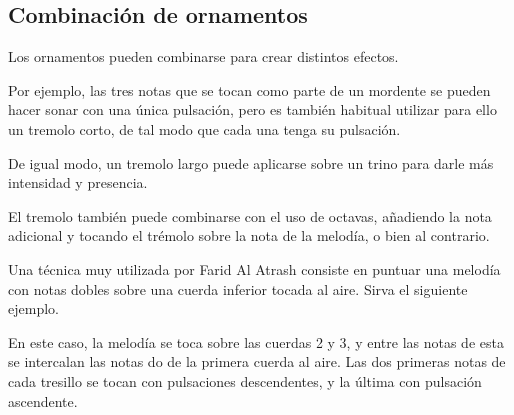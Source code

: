 \subsection{Combinación de ornamentos}

Los ornamentos pueden combinarse para crear distintos efectos.

Por ejemplo, las tres notas que se tocan como parte de un mordente se pueden hacer sonar con una única pulsación, pero es también habitual utilizar para ello un tremolo corto, de tal modo que cada una tenga su pulsación.

De igual modo, un tremolo largo puede aplicarse sobre un trino para darle más intensidad y presencia.

El tremolo también puede combinarse con el uso de octavas, añadiendo la nota adicional y tocando el trémolo sobre la nota de la melodía, o bien al contrario.

Una técnica muy utilizada por Farid Al Atrash consiste en puntuar una melodía con notas dobles sobre una cuerda inferior tocada al aire. Sirva el siguiente ejemplo.

\begin{center}
\end{center}


En este caso, la melodía se toca sobre las cuerdas 2 y 3, y entre las notas de esta se intercalan las notas do de la primera cuerda al aire. Las dos primeras notas de cada tresillo se tocan con pulsaciones descendentes, y la última con pulsación ascendente.

